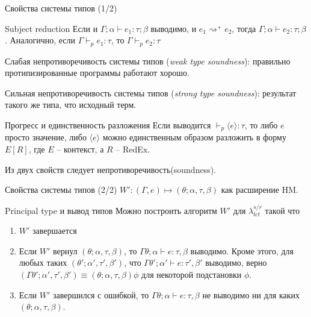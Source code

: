 \documentclass{beamer}
\begin{document}
\begin{frame}[fragile]{Свойства системы типов (1/2)}
\begin{block}{Subject reduction}
Если и $\Gamma; \alpha \vdash e_1:\tau; \beta$ выводимо, и $e_1  \rightsquigarrow^+ e_2$, тогда $\Gamma; \alpha \vdash e_2:\tau; \beta$. Аналогично, если $\Gamma \vdash_p e_1:\tau$, то $\Gamma \vdash_p e_2:\tau$ 
\end{block}\vspace{0.5cm}

Слабая непротиворечивость системы типов (\emph{weak type soundness}): правильно протипизированные программы работают хорошо. \vspace{0.5cm}

Сильная непротиворечивость системы типов (\emph{strong type soundness}): результат такого же типа, что исходный терм.

\begin{block}{Прогресс и единственность разложения}
Если выводится $\vdash_p \langle e\rangle:\tau$, то либо  $e$ просто значение, либо $\langle e\rangle$ можно единственным образом разложить в форму $E[R]$, где $E$ -- контекст, а $R$ -- RedEx.
\end{block}
Из двух свойств следует непротиворечивость(soundness).
\end{frame}

\begin{frame}[fragile]{Свойства системы типов (2/2)}
$W' : (\Gamma,e) \mapsto (\theta; \alpha, \tau, \beta)$ как расширение HM.

\begin{block}{Principal type и вывод типов}
Можно построить алгоритм $W'$ для $\lambda_{let}^{s/r}$ такой что 
\begin{enumerate}
 \item $W'$ завершается
 \item Если $W'$ вернул $(\theta; \alpha, \tau, \beta)$, то $\Gamma\theta; \alpha \vdash e:\tau, \beta$ выводимо. Кроме этого, для любых таких $(\theta'; \alpha',\tau',\beta')$, что $\Gamma\theta'; \alpha' \vdash e:\tau', \beta'$ выводимо, верно $(\Gamma\theta'; \alpha',\tau',\beta') \equiv (\theta; \alpha, \tau, \beta)\phi$ для некоторой подстановки $\phi$.
 \item Если $W'$ завершился с ошибкой, то $\Gamma\theta; \alpha \vdash e:\tau, \beta$ не выводимо ни для каких $(\theta; \alpha, \tau, \beta)$.
\end{enumerate}
\end{block}
\end{frame}
\end{document}

